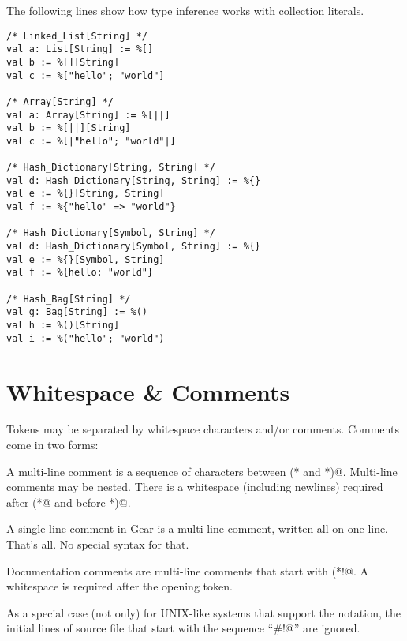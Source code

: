 \example The following lines show how type inference works with collection literals. 
\begin{lstlisting}
/* Linked_List[String] */
val a: List[String] := %[]
val b := %[][String]
val c := %["hello"; "world"]

/* Array[String] */
val a: Array[String] := %[||]
val b := %[||][String]
val c := %[|"hello"; "world"|]

/* Hash_Dictionary[String, String] */
val d: Hash_Dictionary[String, String] := %{}
val e := %{}[String, String]
val f := %{"hello" => "world"}

/* Hash_Dictionary[Symbol, String] */
val d: Hash_Dictionary[Symbol, String] := %{}
val e := %{}[Symbol, String]
val f := %{hello: "world"}

/* Hash_Bag[String] */
val g: Bag[String] := %()
val h := %()[String]
val i := %("hello"; "world")
\end{lstlisting}






\section{Whitespace \& Comments}\label{sec:whitespacecomments}

Tokens may be separated by whitespace characters and/or comments. Comments come in two forms: 

A multi-line comment is a sequence of characters between \lstinline@(* and *)@. Multi-line comments may be nested. There is a whitespace (including newlines) required after \lstinline@(*@ and before \lstinline@*)@. 

A single-line comment in Gear is a multi-line comment, written all on one line. That's all. No special syntax for that. 

Documentation comments are multi-line comments that start with \lstinline@(*!@. A whitespace is required after the opening token. 

As a special case (not only) for UNIX-like systems that support the notation, the initial lines of source file that start with the sequence ``\lstinline@#!@'' are ignored. 








